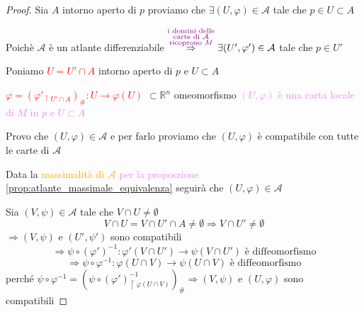         \begin{proof}
        \mbox{}

        Sia $A$ intorno aperto di $p$ proviamo che $\exists (U, \varphi) \in \mathcal{A}$ tale che $p \in U \subset A$

        Poichè $\mathcal{A}$ è un atlante differenziabile $\overset{\textcolor{violet}{\substack{\text{i domini delle} \\ \text{carte di } \mathcal{A} \\ \text{ricoprono } M}}}{\Rightarrow} \exists (U', \varphi') \in \mathcal{A}$ tale che $p \in U'$ 

        Poniamo \textcolor{red}{$U=U' \cap A$} intorno aperto di $p$ e $U \subset A$

        \textcolor{red}{$\varphi = \left( \varphi'_{\restriction{U' \cap A}} \right)_\# \colon U \to \varphi(U)$} $\subset \mathbb{R}^n$ omeomorfismo \textcolor{violet}{$(U, \varphi)$ è
        una carta locale di $M$ in $p$ e $U \subset A$}

        Provo che $(U, \varphi) \in \mathcal{A}$ e per farlo proviamo che $(U, \varphi)$ è compatibile con tutte le carte di $\mathcal{A}$

        Data la \textcolor{orange}{massimalità di $\mathcal{A}$} \textcolor{violet}{per la proposzione \ref{prop:atlante_massimale_equivalenza}} seguirà che $(U, \varphi) \in \mathcal{A}$

        Sia $(V, \psi) \in \mathcal{A}$ tale che $V \cap U \neq \emptyset$
        \[ V \cap U = V \cap U' \cap A \neq \emptyset \Rightarrow V \cap U' \neq \emptyset \]
        $\Rightarrow (V, \psi)$ e $(U', \psi')$ sono compatibili
        \[ \Rightarrow \psi  \circ (\varphi')^{-1} \colon \varphi ' (V \cap U') \to \psi (V \cap U') \text{ è diffeomorfismo} \]
        \[ \Rightarrow \psi \circ \varphi^{-1} \colon \varphi (U \cap V) \to  \psi (U \cap V) \text{ è diffeomorfismo} \]
        perché $\displaystyle \psi \circ \varphi^{-1} = \left( \psi \circ (\varphi')^{-1}_{\restriction \varphi(U \cap V)} \right)_\# \Rightarrow (V, \psi)$ e $(U, \varphi)$ sono compatibili
        \end{proof}
